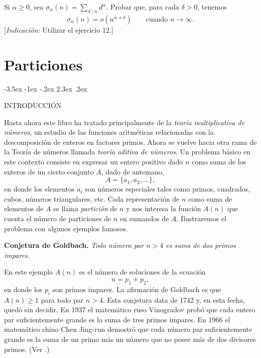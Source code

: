 \documentclass[12pt,a4paper]{book}
\makeatletter
\renewcommand\section{\@startsection{section}{1}{\z@}%
  {-3.5ex \@plus -1ex \@minus -.2ex}%
  {2.3ex \@plus .2ex}%
  {\normalfont\Large\bfseries\raggedright}}
\makeatother
\begin{document}
    \begin{ejercicio}
        Si $\alpha\geq0$, sea $\sigma_{\alpha}(n)=\sum_{d\mid n}d^{\alpha}$. Probar que, para
        cada $\delta>0$, tenemos
        \begin{equation*}
            \sigma_{\alpha}(n)=o(n^{\alpha+\delta})\qquad\text{cuando }n\to\infty.
        \end{equation*}
        [\textit{Indicación:} Utilizar el ejercicio 12.]
    \end{ejercicio}

\chapter{Particiones}

    \section{INTRODUCCIÓN}

    Hasta ahora este libro ha tratado principalmente de la \textit{teoría multiplicativa de
    números}, un estudio de las funciones aritméticas relacionadas con la descomposición de
    enteros en factores primos. Ahora se vuelve hacia otra rama de la Teoría de números llamada
    \textit{teoría aditiva de números}. Un problema básico en este contexto consiste en
    expresar un entero positivo dado $n$ como suma de los enteros de un cierto conjunto $A$,
    dado de antemano,
    \begin{equation*}
        A=\{a_{1},a_{2},\dots\},
    \end{equation*}
    en donde los elementos $a_{i}$ son números especiales tales como primos, cuadrados, cubos,
    números triangulares, etc. Cada representación de $n$ como suma de elementos de $A$ se
    llama \textit{partición} de $n$ y nos interesa la función $A(n)$ que cuenta el número de
    particiones de $n$ en sumandos de $A$. Ilustraremos el problema con algunos ejemplos
    famosos.

    \textbf{Conjetura de Goldbach.} \textit{Todo número par $n>4$ es suma de dos primos
    impares.}

    En este ejemplo $A(n)$ es el número de soluciones de la ecuación
    \begin{equation}\label{eq:14-1}
        n=p_{1}+p_{2},
    \end{equation}
    en donde los $p_{i}$ son primos impares. La afirmación de Goldbach es que $A(n)\geq1$ para
    todo par $n>4$. Esta conjetura data de 1742 \cite{goldbach1742} y, en esta fecha, quedó sin decidir. En 1937 el
    matemático ruso Vinogradov \cite{vinogradov1937} probó que cada entero par suficientemente grande es la suma de
    tres primos impares. En 1966 el matemático chino Chen Jing-run demostró que cada número par
    suficientemente grande es la suma de un primo más un número que no posee más de dos
    divisores primos. (Ver \cite{chen1966}.)
\end{document}
